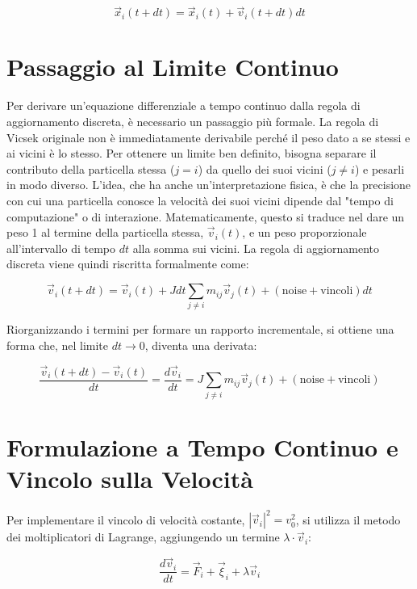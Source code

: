 \begin{equation} \label{eq:ch27_26}
\vec{x}_{i}(t+dt) = \vec{x}_{i}(t) + \vec{v}_{i}(t+dt)dt
\end{equation}


\section{Passaggio al Limite Continuo}
Per derivare un'equazione differenziale a tempo continuo dalla regola di aggiornamento discreta, è necessario un passaggio più formale. La regola di Vicsek originale non è immediatamente derivabile perché il peso dato a se stessi e ai vicini è lo stesso.
Per ottenere un limite ben definito, bisogna separare il contributo della particella stessa ($j=i$) da quello dei suoi vicini ($j \neq i$) e pesarli in modo diverso.
L'idea, che ha anche un'interpretazione fisica, è che la precisione con cui una particella conosce la velocità dei suoi vicini dipende dal "tempo di computazione" o di interazione.
Matematicamente, questo si traduce nel dare un peso 1 al termine della particella stessa, $\vec{v}_i(t)$, e un peso proporzionale all'intervallo di tempo $dt$ alla somma sui vicini.
La regola di aggiornamento discreta viene quindi riscritta formalmente come:

\begin{equation} \label{eq:ch27_27}
\vec{v}_i(t+dt) = \vec{v}_i(t) + J dt \sum_{j \neq i} m_{ij}\vec{v}_j(t) + (\text{noise} + \text{vincoli}) dt
\end{equation}

Riorganizzando i termini per formare un rapporto incrementale, si ottiene una forma che, nel limite $dt \to 0$, diventa una derivata:

\begin{equation} \label{eq:ch27_28}
\frac{\vec{v}_i(t+dt) - \vec{v}_i(t)}{dt}=\frac{d\vec{v}_i}{dt}  = J\sum_{j \neq i} m_{ij}\vec{v}_j(t) + (\text{noise} + \text{vincoli})
\end{equation}


\section{Formulazione a Tempo Continuo e Vincolo sulla Velocità}
Per implementare il vincolo di velocità costante, $|\vec{v}_i|^2 = v_0^2$, si utilizza il metodo dei moltiplicatori di Lagrange, aggiungendo un termine $\lambda \cdot \vec{v}_i$:

\begin{equation} \label{eq:ch27_29}
\frac{d\vec{v}_i}{dt} = \vec{F}_i + \vec{\xi}_i + \lambda \vec{v}_i
\end{equation}

